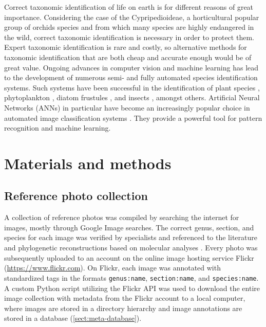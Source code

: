 \documentclass[twocolumn]{bmcart}
\begin{document}
Correct taxonomic identification of life on earth is for different reasons of great importance. Considering the case of the Cypripedioideae, a horticultural popular group of orchids species and from which many species are highly endangered in the wild, correct taxonomic identification is necessary in order to protect them. Expert taxonomic identification is rare and costly, so alternative methods for taxonomic identification that are both cheap and accurate enough would be of great value. Ongoing advances in computer vision and machine learning has lead to the development of numerous semi- and fully automated species identification systems. Such systems have been successful in the identification of plant species \cite{Arinkin2014, Nilsback2008, Sanz2013}, phytoplankton \cite{Boddy1994}, diatom frustules \cite{Kloster2014}, and insects \cite{Weeks1999,Kang2012}, amongst others. Artificial Neural Networks (ANNs) in particular have become an increasingly popular choice in automated image classification systems \cite{Weeks1997}. They provide a powerful tool for pattern recognition and machine learning.

\section{Materials and methods}
\label{sect:methods}

\subsection{Reference photo collection}

A collection of reference photos was compiled by searching the internet for images, mostly through Google Image searches. The correct genus, section, and species for each image was verified by specialists and referenced to the literature \cite{Cribb1998, Pridgeon1999, Frosch2012} and phylogenetic reconstructions based on molecular analyses \cite{Li2011, Chochai2012}. Every photo was subsequently uploaded to an account on the online image hosting service Flickr (\url{https://www.flickr.com}). On Flickr, each image was annotated with standardized tags in the formats \texttt{genus:name}, \texttt{section:name}, and \texttt{species:name}. A custom Python script utilizing the Flickr API was used to download the entire image collection with metadata from the Flickr account to a local computer, where images are stored in a directory hierarchy and image annotations are stored in a database (\ref{sect:meta-database}).
\end{document}
